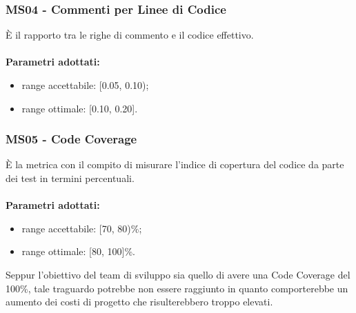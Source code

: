 \subsubsection{MS04 - Commenti per Linee di Codice}
È il rapporto tra le righe di commento e il codice effettivo.\\ \\ 
\textbf{Parametri adottati:} 
\begin{itemize}
\item range accettabile: [0.05, 0.10);
\item range ottimale: [0.10, 0.20].
\end{itemize}
\subsubsection{MS05 - Code Coverage}
È la metrica con il compito di misurare l'indice di copertura del codice da parte dei test in termini percentuali.\\ \\ 
\textbf{Parametri adottati:} 
\begin{itemize}
\item range accettabile: [70, 80)\%;
\item range ottimale: [80, 100]\%.
\end{itemize}
Seppur l'obiettivo del team di sviluppo sia quello di avere una Code Coverage del 100\%, tale traguardo potrebbe non essere raggiunto in quanto comporterebbe un aumento dei costi di progetto che risulterebbero troppo elevati.

